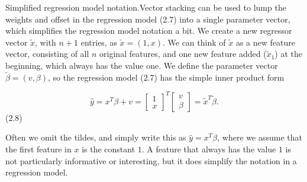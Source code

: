 Simplified regression model notation.Vector stacking can be used to lump the weights and offset in the regression model (2.7) into a single parameter vector, which simplifies the regression model notation a bit. We create a new regressor vector \(\tilde{x}\), with \(n+1\) entries, as \(\tilde{x}=(1,x)\). We can think of \(\tilde{x}\) as a new feature vector, consisting of all \(n\) original features, and one new feature added (\(\tilde{x}_{1}\)) at the beginning, which always has the value one. We define the parameter vector \(\tilde{\beta}=(v,\beta)\), so the regression model (2.7) has the simple inner product form

\[\hat{y}=x^{T}\beta+v=\left[\begin{array}{c}1\\ x\end{array}\right]^{T}\left[\begin{array}{c}v\\ \beta\end{array}\right]=\tilde{x}^{T}\tilde{\beta}.\] (2.8)

Often we omit the tildes, and simply write this as \(\hat{y}=x^{T}\beta\), where we assume that the first feature in \(x\) is the constant \(1\). A feature that always has the value \(1\) is not particularly informative or interesting, but it does simplify the notation in a regression model.

